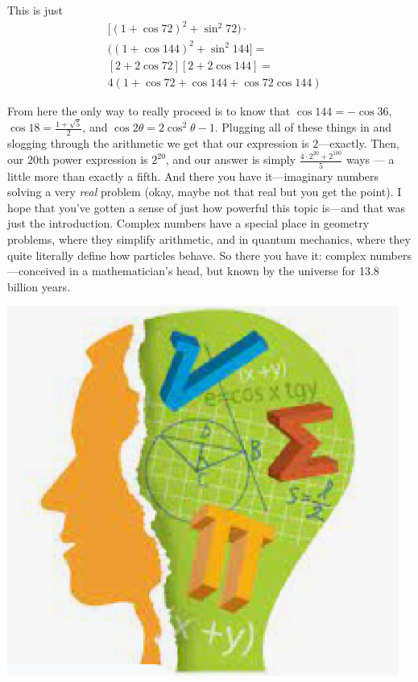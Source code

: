 \documentclass{article}
\begin{document}
This is just 
\begin{align*}
 & [(1+\cos 72)^2+\sin^2 72)  \cdot   \\
 & ((1+\cos 144)^2+\sin^2 144]  = \\
 & [2+2\cos 72][2+2\cos 144]  = \\
 & 4(1+\cos 72+\cos 144+\cos 72 \cos 144)
\end{align*}


From here the only way to really proceed is to know that $\cos 144=-\cos 36$, $\cos 18=\frac{1+\sqrt5}{2}$, and $\cos 2\theta=2\cos^2 \theta -1$. Plugging all of these things in and slogging through the arithmetic we get that our expression is $2$—exactly. Then, our $20$th power expression is $2^20$, and our answer is simply $\frac{4\cdot 2^{20}+2^{100}}{5}$ ways — a little more than exactly a fifth. 
And there you have it—imaginary numbers solving a very \emph{real} problem (okay, maybe not that real but you get the point). I hope that you’ve gotten a sense of just how powerful this topic is—and that was just the introduction. Complex numbers have a special place in geometry problems, where they simplify arithmetic, and in quantum mechanics, where they quite literally define how particles behave. So there you have it: complex numbers—conceived in a mathematician's head, but known by the universe for 13.8 billion years. 
\begin{center}
    \includegraphics[scale=0.7]{images/root2.png}
\end{center}
\end{document}
